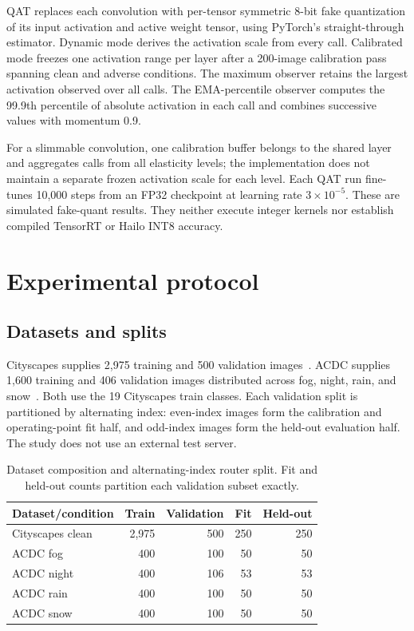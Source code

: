 \documentclass[a4paper,review,12pt]{elsarticle}
\begin{document}
QAT replaces each convolution with per-tensor symmetric 8-bit fake quantization of its input activation and active weight tensor, using PyTorch's straight-through estimator. Dynamic mode derives the activation scale from every call. Calibrated mode freezes one activation range per layer after a 200-image calibration pass spanning clean and adverse conditions. The maximum observer retains the largest activation observed over all calls. The EMA-percentile observer computes the 99.9th percentile of absolute activation in each call and combines successive values with momentum 0.9.

For a slimmable convolution, one calibration buffer belongs to the shared layer and aggregates calls from all elasticity levels; the implementation does not maintain a separate frozen activation scale for each level. Each QAT run fine-tunes 10,000 steps from an FP32 checkpoint at learning rate $3\times10^{-5}$. These are simulated fake-quant results. They neither execute integer kernels nor establish compiled TensorRT or Hailo INT8 accuracy.

\section{Experimental protocol}
\label{sec:protocol}

\subsection{Datasets and splits}

Cityscapes supplies 2,975 training and 500 validation images~\cite{cordts2016cityscapes}. ACDC supplies 1,600 training and 406 validation images distributed across fog, night, rain, and snow~\cite{sakaridis2021acdc}. Both use the 19 Cityscapes train classes. Each validation split is partitioned by alternating index: even-index images form the calibration and operating-point fit half, and odd-index images form the held-out evaluation half. The study does not use an external test server.

\begin{table}[H]
\centering
\caption{Dataset composition and alternating-index router split. Fit and held-out counts partition each validation subset exactly.}
\label{tab:dataset-splits}
\small
\begin{tabular}{@{}lrrrr@{}}
\toprule
Dataset/condition & Train & Validation & Fit & Held-out \\
\midrule
Cityscapes clean & 2,975 & 500 & 250 & 250 \\
ACDC fog   & 400 & 100 & 50 & 50 \\
ACDC night & 400 & 106 & 53 & 53 \\
ACDC rain  & 400 & 100 & 50 & 50 \\
ACDC snow  & 400 & 100 & 50 & 50 \\
\bottomrule
\end{tabular}
\end{table}
\end{document}
